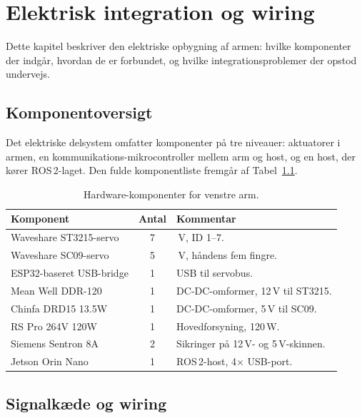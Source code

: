 \chapter{Elektrisk integration og wiring}
\label{ch:el}

Dette kapitel beskriver den elektriske opbygning af armen: hvilke
komponenter der indgår, hvordan de er forbundet, og hvilke
integrationsproblemer der opstod undervejs.

\section{Komponentoversigt}

Det elektriske delsystem omfatter komponenter på tre niveauer:
aktuatorer i armen, en kommunikations-mikrocontroller mellem arm og
host, og en host, der kører ROS\,2-laget. Den fulde komponentliste
fremgår af Tabel~\ref{tab:komponenter-venstre-arm}.

\begin{table}[H]
\centering
\caption{Hardware-komponenter for venstre arm.}
\label{tab:komponenter-venstre-arm}
\renewcommand{\arraystretch}{1.2}
\begin{tabular}{@{}>{\raggedright\arraybackslash}p{}
                  c
                  >{\raggedright\arraybackslash}p{}@{}}
\toprule
\textbf{Komponent} & \textbf{Antal} & \textbf{Kommentar} \\
\midrule
Waveshare ST3215-servo        & 7 & 12\,V, ID 1--7. \\
Waveshare SC09-servo          & 5 & 5\,V, håndens fem fingre. \\
ESP32-baseret USB-bridge      & 1 & USB til servobus. \\
Mean Well DDR-120             & 1 & DC-DC-omformer, 12\,V til ST3215. \\
Chinfa DRD15 13.5W            & 1 & DC-DC-omformer, 5\,V til SC09. \\
RS Pro 264V 120W              & 1 & Hovedforsyning, 120\,W. \\
Siemens Sentron 8A            & 2 & Sikringer på 12\,V- og 5\,V-skinnen. \\
Jetson Orin Nano              & 1 & ROS\,2-host, 4$\times$ USB-port. \\
\bottomrule
\end{tabular}
\end{table}

\section{Signalkæde og wiring}

